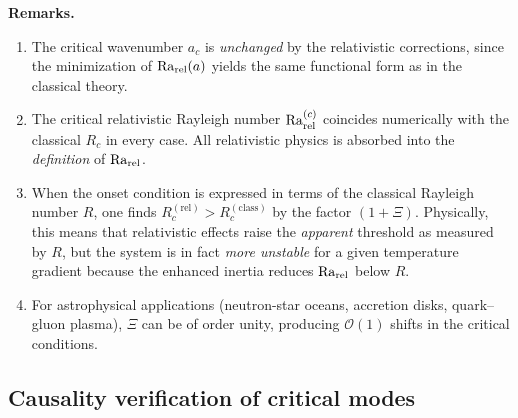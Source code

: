 \noindent\textbf{Remarks.}
\begin{enumerate}
\item The critical wavenumber $a_{c}$ is \emph{unchanged} by the
  relativistic corrections, since the minimization of $\mathrm{Ra}_{\mathrm{rel}}(a)$ yields
  the same functional form as in the classical theory.

\item The critical relativistic Rayleigh number $\mathrm{Ra}_{\mathrm{rel}}^{(c)}$ coincides
  numerically with the classical $R_{c}$ in every case. All relativistic
  physics is absorbed into the \emph{definition} of $\mathrm{Ra}_{\mathrm{rel}}$.

\item When the onset condition is expressed in terms of the classical
  Rayleigh number $R$, one finds $R_{c}^{(\mathrm{rel})} >
  R_{c}^{(\mathrm{class})}$ by the factor $(1+\Xi)$.
  Physically, this means that relativistic effects raise the
  \emph{apparent} threshold as measured by $R$, but the system is in
  fact \emph{more unstable} for a given temperature gradient because
  the enhanced inertia reduces $\mathrm{Ra}_{\mathrm{rel}}$ below $R$.

\item For astrophysical applications (neutron-star oceans, accretion
  disks, quark--gluon plasma), $\Xi$ can be of order unity, producing
  $\mathcal{O}(1)$ shifts in the critical conditions.
\end{enumerate}


\subsection{Causality verification of critical modes}
\label{sec:rel-15-causality}

